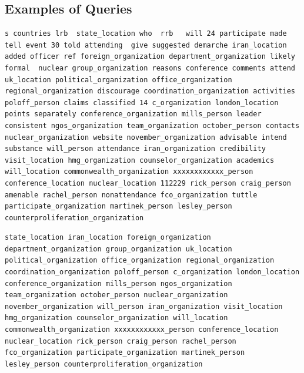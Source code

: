 \documentclass{l4proj}
\newenvironment{codelisting}{\captionsetup{type=listing}}{}
\begin{document}
\begin{appendices}
\chapter{Examples of Queries}
\begin{codelisting}
\begin{verbatim}
s countries lrb  state_location who  rrb   will 24 participate made tell event 30 told attending  give suggested demarche iran_location added officer ref foreign_organization department_organization likely formal  nuclear group_organization reasons conference comments attend uk_location political_organization office_organization regional_organization discourage coordination_organization activities poloff_person claims classified 14 c_organization london_location points separately conference_organization mills_person leader consistent ngos_organization team_organization october_person contacts nuclear_organization website november_organization advisable intend substance will_person attendance iran_organization credibility visit_location hmg_organization counselor_organization academics will_location commonwealth_organization xxxxxxxxxxxx_person conference_location nuclear_location 112229 rick_person craig_person amenable rachel_person nonattendance fco_organization tuttle participate_organization martinek_person lesley_person counterproliferation_organization
\end{verbatim}
\label{code:all_terms_query}
\end{codelisting}
\begin{codelisting}
\begin{verbatim}
state_location iran_location foreign_organization department_organization group_organization uk_location political_organization office_organization regional_organization coordination_organization poloff_person c_organization london_location conference_organization mills_person ngos_organization team_organization october_person nuclear_organization november_organization will_person iran_organization visit_location hmg_organization counselor_organization will_location commonwealth_organization xxxxxxxxxxxx_person conference_location nuclear_location rick_person craig_person rachel_person fco_organization participate_organization martinek_person lesley_person counterproliferation_organization
\end{verbatim}

\end{codelisting}
\end{appendices}
\end{document}
